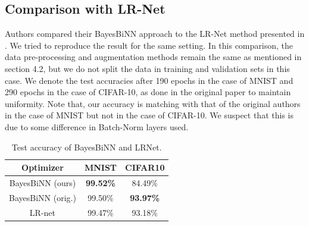 \subsection{Comparison with LR-Net}
Authors compared their BayesBiNN approach to the LR-Net method presented in \citet{r8}. We tried to reproduce the result for the same setting. In this comparison, the data pre-processing and augmentation methods remain the same as mentioned in section 4.2, but we do not split the data in training and validation sets in this case. We denote the test accuracies after 190 epochs in the case of MNIST and 290 epochs in the case of CIFAR-10, as done in the original paper to maintain uniformity. Note that, our accuracy is matching with that of the original authors in the case of MNIST but not in the case of CIFAR-10. We suspect that this is due to some difference in Batch-Norm layers used.

\begin{table}[h]
\begin{center}
\renewcommand{\arraystretch}{1.1}
\begin{tabular}{ | c | c | c |}
\hline
 Optimizer & MNIST &  CIFAR10 \\ \hline
   BayesBiNN (ours) & \textbf{99.52\%} & 84.49\% \\ \hline
   BayesBiNN (orig.) & 99.50\% & \textbf{93.97\%} \\ \hline
   LR-net \citet{r8} & 99.47\% & 93.18\% \\
\hline
\end{tabular}
\caption{Test accuracy of BayesBiNN and LRNet.}
\label{tab:LR_result_2}

\end{center}
\end{table}

